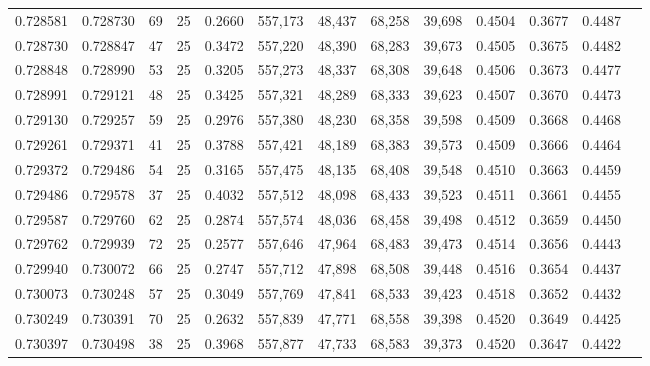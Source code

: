 \begin{tabular}{rrrrrrrrrrrrr}
0.728581 & 0.728730 &    69 &  25 &                                     0.2660 & 557,173 &  48,437 &  68,258 &  39,698 & 0.4504 & 0.3677 & 0.4487 \\
0.728730 & 0.728847 &    47 &  25 &                                     0.3472 & 557,220 &  48,390 &  68,283 &  39,673 & 0.4505 & 0.3675 & 0.4482 \\
0.728848 & 0.728990 &    53 &  25 &                                     0.3205 & 557,273 &  48,337 &  68,308 &  39,648 & 0.4506 & 0.3673 & 0.4477 \\
0.728991 & 0.729121 &    48 &  25 &                                     0.3425 & 557,321 &  48,289 &  68,333 &  39,623 & 0.4507 & 0.3670 & 0.4473 \\
0.729130 & 0.729257 &    59 &  25 &                                     0.2976 & 557,380 &  48,230 &  68,358 &  39,598 & 0.4509 & 0.3668 & 0.4468 \\
0.729261 & 0.729371 &    41 &  25 &                                     0.3788 & 557,421 &  48,189 &  68,383 &  39,573 & 0.4509 & 0.3666 & 0.4464 \\
0.729372 & 0.729486 &    54 &  25 &                                     0.3165 & 557,475 &  48,135 &  68,408 &  39,548 & 0.4510 & 0.3663 & 0.4459 \\
0.729486 & 0.729578 &    37 &  25 &                                     0.4032 & 557,512 &  48,098 &  68,433 &  39,523 & 0.4511 & 0.3661 & 0.4455 \\
0.729587 & 0.729760 &    62 &  25 &                                     0.2874 & 557,574 &  48,036 &  68,458 &  39,498 & 0.4512 & 0.3659 & 0.4450 \\
0.729762 & 0.729939 &    72 &  25 &                                     0.2577 & 557,646 &  47,964 &  68,483 &  39,473 & 0.4514 & 0.3656 & 0.4443 \\
0.729940 & 0.730072 &    66 &  25 &                                     0.2747 & 557,712 &  47,898 &  68,508 &  39,448 & 0.4516 & 0.3654 & 0.4437 \\
0.730073 & 0.730248 &    57 &  25 &                                     0.3049 & 557,769 &  47,841 &  68,533 &  39,423 & 0.4518 & 0.3652 & 0.4432 \\
0.730249 & 0.730391 &    70 &  25 &                                     0.2632 & 557,839 &  47,771 &  68,558 &  39,398 & 0.4520 & 0.3649 & 0.4425 \\
0.730397 & 0.730498 &    38 &  25 &                                     0.3968 & 557,877 &  47,733 &  68,583 &  39,373 & 0.4520 & 0.3647 & 0.4422 \\

\end{tabular}
